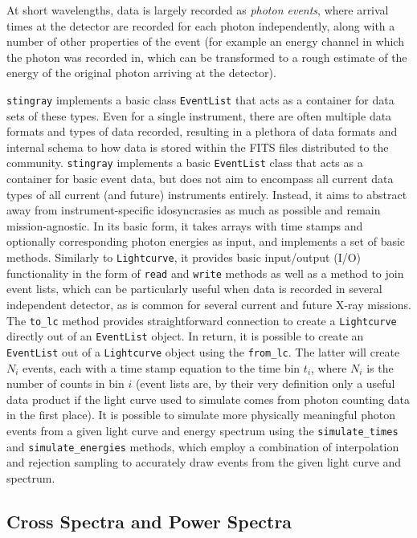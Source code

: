 \documentclass[12pt]{emulateapj}
\newcommand{\stingray}{\texttt{stingray}\xspace}
\newcommand{\lightcurve}{\texttt{Lightcurve}\xspace}
\newcommand{\eventlist}{\texttt{EventList}\xspace}
\begin{document}
At short wavelengths, data is largely recorded as \textit{photon events}, where arrival times at the detector are recorded for each photon independently, along with a number of other properties of the event (for example an energy channel in which the photon was recorded in, which can be transformed to a rough estimate of the energy of the original photon arriving at the detector).

\stingray implements a basic class \eventlist that acts as a container for data sets of these types. Even for a single instrument, there are often multiple data formats and types of data recorded, resulting in a plethora of data formats and internal schema to how data is stored within the FITS files distributed to the community. 
\stingray implements a basic \eventlist class that acts as a container for basic event data, but does not aim to encompass all current data types of all current (and future) instruments entirely. Instead, it aims to abstract away from instrument-specific idosyncrasies as much as possible and remain mission-agnostic. In its basic form, it takes arrays with time stamps and optionally corresponding photon energies as input, and implements a set of basic methods. Similarly to \lightcurve, it provides basic input/output (I/O) functionality in the form of \texttt{read} and \texttt{write} methods as well as a method to join event lists, which can be particularly useful when data is recorded in several independent detector, as is common for several current and future X-ray missions. The \verb|to_lc| method provides straightforward connection to create a \lightcurve directly out of an \eventlist object. In return, it is possible to create an \eventlist out of a \lightcurve object using the \verb|from_lc|. The latter will create $N_i$ events, each with a time stamp equation to the time bin $t_i$, where $N_i$ is the number of counts in bin $i$ (event lists are, by their very definition only a useful data product if the light curve used to simulate comes from photon counting data in the first place). 
It is possible to simulate more physically meaningful photon events from a given light curve and energy spectrum using the \verb|simulate_times| and \verb|simulate_energies| methods, which employ a combination of interpolation and rejection sampling to accurately draw events from the given light curve and spectrum.


\subsection{Cross Spectra and Power Spectra}
\label{sec:csps}
\end{document}
